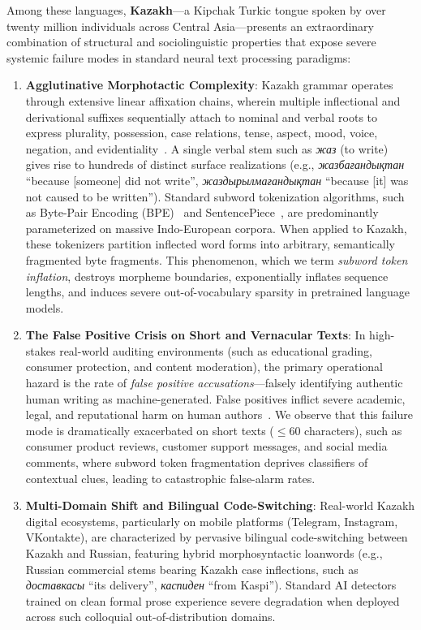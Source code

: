 Among these languages, \textbf{Kazakh}---a Kipchak Turkic tongue spoken by over twenty million individuals across Central Asia---presents an extraordinary combination of structural and sociolinguistic properties that expose severe systemic failure modes in standard neural text processing paradigms:
\begin{enumerate}
    \item \textbf{Agglutinative Morphotactic Complexity}: Kazakh grammar operates through extensive linear affixation chains, wherein multiple inflectional and derivational suffixes sequentially attach to nominal and verbal roots to express plurality, possession, case relations, tense, aspect, mood, voice, negation, and evidentiality~\citep{makhambetov2013kazakh,bekmanova2021kazakh}. A single verbal stem such as \textit{жаз} (to write) gives rise to hundreds of distinct surface realizations (e.g., \textit{жазбағандықтан} ``because [someone] did not write'', \textit{жаздырылмағандықтан} ``because [it] was not caused to be written''). Standard subword tokenization algorithms, such as Byte-Pair Encoding (BPE)~\citep{sennrich2016subword} and SentencePiece~\citep{kudo2018sentencepiece}, are predominantly parameterized on massive Indo-European corpora. When applied to Kazakh, these tokenizers partition inflected word forms into arbitrary, semantically fragmented byte fragments. This phenomenon, which we term \textit{subword token inflation}, destroys morpheme boundaries, exponentially inflates sequence lengths, and induces severe out-of-vocabulary sparsity in pretrained language models.
    \item \textbf{The False Positive Crisis on Short and Vernacular Texts}: In high-stakes real-world auditing environments (such as educational grading, consumer protection, and content moderation), the primary operational hazard is the rate of \textit{false positive accusations}---falsely identifying authentic human writing as machine-generated. False positives inflict severe academic, legal, and reputational harm on human authors~\citep{liang2023gptdetectors}. We observe that this failure mode is dramatically exacerbated on short texts ($\le 60$ characters), such as consumer product reviews, customer support messages, and social media comments, where subword token fragmentation deprives classifiers of contextual clues, leading to catastrophic false-alarm rates.
    \item \textbf{Multi-Domain Shift and Bilingual Code-Switching}: Real-world Kazakh digital ecosystems, particularly on mobile platforms (Telegram, Instagram, VKontakte), are characterized by pervasive bilingual code-switching between Kazakh and Russian, featuring hybrid morphosyntactic loanwords (e.g., Russian commercial stems bearing Kazakh case inflections, such as \textit{доставкасы} ``its delivery'', \textit{каспиден} ``from Kaspi''). Standard AI detectors trained on clean formal prose experience severe degradation when deployed across such colloquial out-of-distribution domains.

\end{enumerate}
